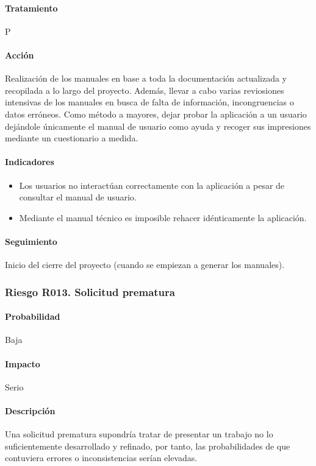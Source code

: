 \documentclass[10pt,a4paper]{article}
\begin{document}
				\paragraph{Tratamiento} P
				\paragraph{Acción} Realización de los manuales en base a toda la documentación actualizada y recopilada a lo largo del proyecto. Además, llevar a cabo varias reviosiones intensivas de los manuales en busca de falta de información, incongruencias o datos erróneos. Como método a mayores, dejar probar la aplicación a un usuario dejándole únicamente el manual de usuario como ayuda y recoger sus impresiones mediante un cuestionario a medida.
				\paragraph{Indicadores} 
				\begin{itemize}
				    \item Los usuarios no interactúan correctamente con la aplicación a pesar de consultar el manual de usuario.
				    \item Mediante el manual técnico es imposible rehacer idénticamente la aplicación.
				\end{itemize}				 
				\paragraph{Seguimiento}	Inicio del cierre del proyecto (cuando se empiezan a generar los manuales).
				
				\subsubsection{Riesgo R013. Solicitud prematura}
				\paragraph{Probabilidad} Baja
				\paragraph{Impacto}	Serio
				\paragraph{Descripción} Una solicitud prematura supondría tratar de presentar un trabajo no lo suficientemente desarrollado y refinado, por tanto, las probabilidades de que contuviera errores o inconsistencias serían elevadas.
\end{document}
